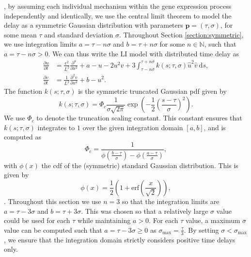  \cite{william}, by assuming each individual mechanism within the gene expression process  independently and identically, we use the central limit theorem to model the delay as a symmetric Gaussian distribution with parameters $\textbf{p}=(\tau,\sigma)$, for some mean $\tau$ and standard deviation $\sigma$. Throughout Section \ref{section:symmetric}, we use integration limits $a=\tau-n\sigma$ and $b=\tau+n\sigma$ for some $n\in\mathbb{N}$, such that $a=\tau-n\sigma>0$. We can thus write the LI model with distributed time delay as
\begin{equation}\label{symmod}
    \begin{split}
        \frac{\partial u}{\partial t}&=\frac{\epsilon^2}{L^2}\frac{\partial^u}{\partial x^2}+a-u-2u^2v+3\int_{\tau-n\sigma}^{\tau+n\sigma}k(s;\tau,\sigma)\hat{u}^2\hat{v}\ \text{d}s,\\
        \frac{\partial v}{\partial t}&=\frac{1}{L^2}\frac{\partial^2v}{\partial x^2}+b-u^2.
    \end{split}
\end{equation}
The function $k(s;\tau,\sigma)$ is the symmetric truncated Gaussian pdf given by
\begin{equation}
k(s;\tau,\sigma)=\Phi_c\frac{1}{\sigma\sqrt{2\pi}}\exp\left(-\frac{1}{2}\left(\frac{s-\tau}{\sigma}\right)^2\right).
\end{equation}
We use $\Phi_c$ to denote the truncation scaling constant. This constant ensures that $k(s;\tau,\sigma)$ integrates to $1$ over the given integration domain $[a,b]$, and is computed as
\begin{equation}
    \Phi_c=\frac{1}{\phi\left(\frac{b-\tau}{\sigma}\right)-\phi\left(\frac{a-\tau}{\sigma}\right)},
\end{equation}
with $\phi(x)$ the cdf of the (symmetric) standard Gaussian distribution. This is given by
\begin{equation}\label{phi}
    \phi(x)=\frac{1}{2}\left(1+\text{erf}\left(\frac{x}{\sqrt{2}}\right)\right),
\end{equation}
. Throughout this section we use $n=3$ so that the integration limits are $a=\tau-3\sigma$ and $b=\tau+3\sigma$. This was chosen so that a relatively large $\sigma$ value could be used for each $\tau$ while maintaining $a>0$. For each $\tau$ value, a maximum $\sigma$ value can be computed such that $a=\tau-3\sigma\geq0$ as $\sigma_{\max}=\frac{\tau}{3}$. By setting $\sigma<\sigma_{\max}$, we ensure that the integration domain strictly considers positive time delays only.

